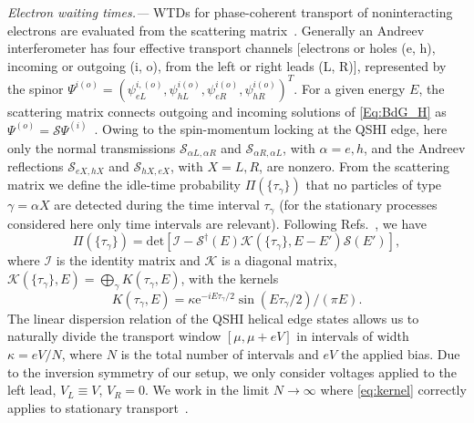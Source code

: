 \documentclass[aps,prl,amsmath,twocolumn,floatfix,superscriptaddress,longbibliography,footinbib]{revtex4-1}
\newcommand{\e}{\mathrm{e}}
\begin{document}
\textit{Electron waiting times.---}
WTDs for phase-coherent transport of noninteracting electrons are evaluated from the scattering matrix~\cite{Albert2012,Haack2014,Mi2018}. 
Generally an Andreev interferometer has four effective transport channels [electrons or holes (e, h), incoming or outgoing (i, o), from the left or right leads (L, R)], represented by the spinor $\Psi^{i(o)}=(\psi_{eL}^{i,(o)}, \psi_{hL}^{i(o)}, \psi_{eR}^{i(o)}, \psi_{hR}^{i(o)})^T$. For a given energy $E$, the scattering matrix connects outgoing and incoming solutions of \cref{Eq:BdG_H} as $\Psi^{(o)}= \mathcal{S}\Psi^{(i)}$~\cite{SM}. Owing to the spin-momentum locking at the QSHI edge, here only the normal transmissions $\mathcal{S}_{\alpha L,\alpha R}$ and $ \mathcal{S}_{\alpha R,\alpha L}$, with $\alpha=e,h$, and the Andreev reflections $ \mathcal{S}_{e X, hX}$ and $ \mathcal{S}_{h X, e X}$, with $X=L,R$, are nonzero. From the scattering matrix we define the idle-time probability $\Pi(\{\tau_\gamma\})$ that no particles of type $\gamma=\alpha X$ are detected during the time interval $\tau_\gamma$ (for the stationary processes considered here only time intervals are relevant). Following Refs.~\cite{Haack2014, Mi2018}, we have
\begin{equation}\label{eq:itp}
	\Pi(\{\tau_\gamma\})= \mathrm{det}[\mathcal{I}-\mathcal{S}^{\dagger}(E) \mathcal{K}(\{\tau_\gamma\},E-E') \mathcal{S}(E') ] , 
\end{equation}
where $\mathcal{I}$ is the identity matrix and $\mathcal{K}$ is a diagonal matrix, 
$\mathcal{K}(\{\tau_\gamma\},E) =\bigoplus_{\gamma} K( \tau_\gamma, E)$,
with the kernels~\cite{SM}
\begin{equation}\label{eq:kernel}
	K(\tau_\gamma, E)= \kappa \e^{-i E \tau_\gamma/2 } \sin (E \tau_\gamma/2) / (\pi E ) . 
\end{equation}
The linear dispersion relation of the QSHI helical edge states allows us to naturally divide the transport window $[\mu , \mu + eV ]$ in intervals of width $\kappa=eV/N$, where $N$ is the total number of intervals and $eV$ the applied bias. Due to the inversion symmetry of our setup, we only consider voltages applied to the left lead, $V_L\equiv V$, $V_R=0$. We work in the limit $N\rightarrow\infty$ where \cref{eq:kernel} correctly applies to stationary transport~\cite{Haack2014}. 
\end{document}
